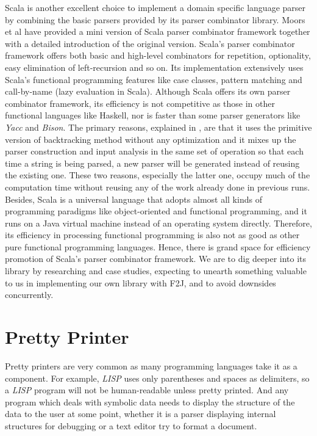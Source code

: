 Scala is another excellent choice to implement a domain specific language parser by combining the basic parsers provided by its parser combinator library. Moors et al \cite{Moors:2008} have provided a mini version of Scala parser combinator framework together with a detailed introduction of the original version. Scala's parser combinator framework offers both basic and high-level combinators for repetition, optionality, easy elimination of left-recursion and so on. Its implementation extensively uses Scala's functional programming features like case classes, pattern matching and call-by-name (lazy evaluation in Scala). Although Scala offers its own parser combinator framework, its efficiency is not competitive as those in other functional languages like Haskell, nor is faster than some parser generators like \textit{Yacc} and \textit{Bison}. The primary reasons, explained in \cite{Scala:2008}, are that it uses the primitive version of backtracking method without any optimization and it mixes up the parser construction and input analysis in the same set of operation so that each time a string is being parsed, a new parser will be generated instead of reusing the existing one. These two reasons, especially the latter one, occupy much of the computation time without reusing any of the work already done in previous runs. Besides, Scala is a universal language that adopts almost all kinds of programming paradigms like object-oriented and functional programming, and it runs on a Java virtual machine instead of an operating system directly. Therefore, its efficiency in processing functional programming is also not as good as other pure functional programming languages. Hence, there is grand space for efficiency promotion of Scala's parser combinator framework. We are to dig deeper into its library by researching and case studies, expecting to unearth something valuable to us in implementing our own library with F2J, and to avoid downsides concurrently.

\section{Pretty Printer}

Pretty printers are very common as many programming languages take it as a component. For example, \textit{LISP} uses only parentheses and spaces as delimiters, so a \textit{LISP} program will not be human-readable unless pretty printed. And any program which deals with symbolic data needs to display the structure of the data to the user at some point, whether it is a parser displaying internal structures for debugging or a text editor try to format a document.

